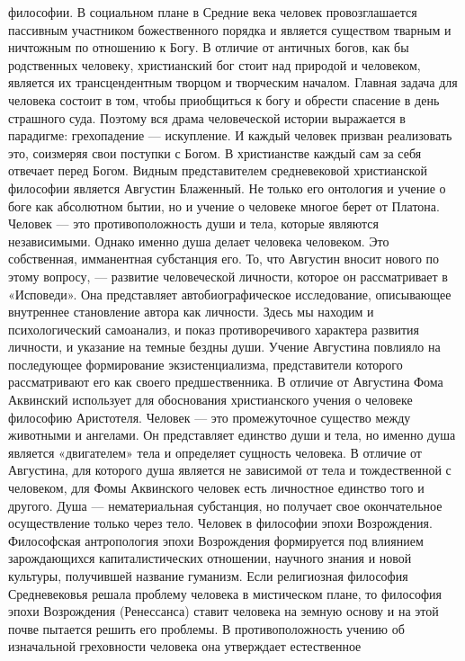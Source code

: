 \documentclass[12pt]{article}
\begin{document}
философии.
В социальном плане в Средние века человек провозглашается пассивным участником божественного порядка и
является существом тварным и ничтожным по отношению к Богу. В отличие от античных богов, как бы
родственных человеку, христианский бог стоит над природой и человеком, является их трансцендентным
творцом и творческим началом. Главная задача для человека состоит в том, чтобы приобщиться к богу и
обрести спасение в день страшного суда. Поэтому вся драма человеческой истории выражается в парадигме:
грехопадение — искупление. И каждый человек призван реализовать это, соизмеряя свои поступки с Богом. В
христианстве каждый сам за себя отвечает перед Богом.
Видным представителем средневековой христианской философии является Августин Блаженный. Не только его
онтология и учение о боге как абсолютном бытии, но и учение о человеке многое берет от Платона. Человек —
это противоположность души и тела, которые являются независимыми. Однако именно душа делает человека
человеком. Это собственная, имманентная субстанция его. То, что Августин вносит нового по этому вопросу, —
развитие человеческой личности, которое он рассматривает в «Исповеди». Она представляет
автобиографическое исследование, описывающее внутреннее становление автора как личности. Здесь мы
находим и психологический самоанализ, и показ противоречивого характера развития личности, и указание на
темные бездны души. Учение Августина повлияло на последующее формирование экзистенциализма,
представители которого рассматривают его как своего предшественника.
В отличие от Августина Фома Аквинский использует для обоснования христианского учения о человеке
философию Аристотеля. Человек — это промежуточное существо между животными и ангелами. Он
представляет единство души и тела, но именно душа является «двигателем» тела и определяет сущность
человека. В отличие от Августина, для которого душа является не зависимой от тела и тождественной с
человеком, для Фомы Аквинского человек есть личностное единство того и другого. Душа — нематериальная
субстанция, но получает свое окончательное осуществление только через тело.
Человек в философии эпохи Возрождения.
Философская антропология эпохи Возрождения формируется под влиянием зарождающихся капиталистических
отношении, научного знания и новой культуры, получившей название гуманизм.
Если религиозная философия Средневековья решала проблему человека в мистическом плане, то философия
эпохи Возрождения (Ренессанса) ставит человека на земную основу и на этой почве пытается решить его
проблемы. В противоположность учению об изначальной греховности человека она утверждает естественное
\end{document}
